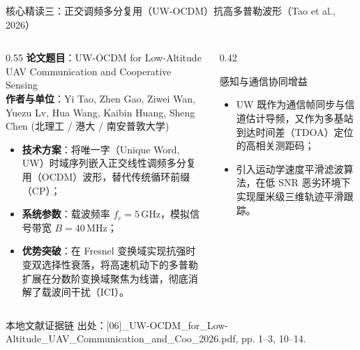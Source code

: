 \documentclass[aspectratio=169, 10pt]{ctexbeamer}
\begin{document}
\begin{frame}{核心精读三：正交调频多分复用（UW-OCDM）抗高多普勒波形（Tao et al., 2026）}
  \begin{columns}
    \begin{column}{0.55\textwidth}
      \textbf{论文题目}：UW-OCDM for Low-Altitude UAV Communication and Cooperative Sensing\\
      \textbf{作者与单位}：Yi Tao, Zhen Gao, Ziwei Wan, Yuezu Lv, Hua Wang, Kaibin Huang, Sheng Chen (北理工 / 港大 / 南安普敦大学)
      \begin{itemize}
        \item \textbf{技术方案}：将唯一字（Unique Word, UW）时域序列嵌入正交线性调频多分复用（OCDM）波形，替代传统循环前缀（CP）；
        \item \textbf{系统参数}：载波频率 $f_c = 5$\,GHz，模拟信号带宽 $B = 40$\,MHz；
        \item \textbf{优势突破}：在 Fresnel 变换域实现抗强时变双选择性衰落，将高速机动下的多普勒扩展在分数阶变换域聚焦为线谱，彻底消解了载波间干扰（ICI）。
      \end{itemize}
    \end{column}
    \begin{column}{0.42\textwidth}
      \begin{block}{感知与通信协同增益}
        \begin{itemize}
          \item UW 既作为通信帧同步与信道估计导频，又作为多基站到达时间差（TDOA）定位的高相关测距码；
          \item 引入运动学速度平滑滤波算法，在低 SNR 恶劣环境下实现厘米级三维轨迹平滑跟踪。
        \end{itemize}
      \end{block}
    \end{column}
  \end{columns}

  \begin{block}{本地文献证据链}
    \footnotesize \textcolor{evidencegray}{出处：[06]\_UW-OCDM\_for\_Low-Altitude\_UAV\_Communication\_and\_Coo\_2026.pdf, pp. 1--3, 10--14.}
  \end{block}
\end{frame}
\end{document}
